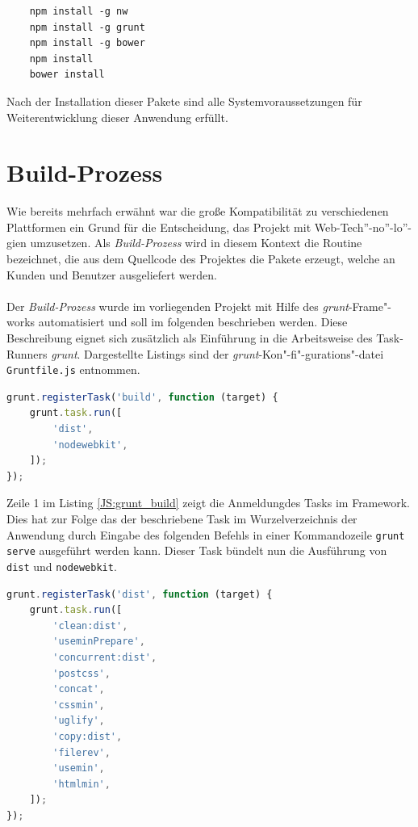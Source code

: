 \begin{lstlisting}
	npm install -g nw
	npm install -g grunt
	npm install -g bower
	npm install
	bower install
\end{lstlisting}

Nach der Installation dieser Pakete sind alle Systemvoraussetzungen für Weiterentwicklung dieser Anwendung erfüllt. 

\section{Build-Prozess}
Wie bereits mehrfach erwähnt war die große Kompatibilität zu verschiedenen Plattformen ein Grund für die Entscheidung, das Projekt mit Web-Tech”-no”-lo”-gien umzusetzen. Als \textit{Build-Prozess} wird in diesem Kontext die Routine bezeichnet, die aus dem Quellcode des Projektes die Pakete erzeugt, welche an Kunden und Benutzer ausgeliefert werden.

\paragraph{}Der \textit{Build-Prozess} wurde im vorliegenden Projekt mit Hilfe des \textit{grunt}-Frame"-works automatisiert und soll im folgenden beschrieben werden. Diese Beschreibung eignet sich zusätzlich als Einführung in die Arbeitsweise des \glqq Task-Runners \grqq \textit{grunt}. Dargestellte Listings sind der \textit{grunt}-Kon"-fi"-gurations"-datei \\\texttt{Gruntfile.js} entnommen.

\begin{lstlisting}[language=JavaScript,label=JS:grunt_build,caption=grunt build-Task]
grunt.registerTask('build', function (target) {
	grunt.task.run([
		'dist',
		'nodewebkit',
	]);
});
\end{lstlisting}

Zeile 1 im Listing \ref{JS:grunt_build} zeigt die \glqq Anmeldung\grqq des Tasks im Framework. Dies hat zur Folge das der beschriebene Task im Wurzelverzeichnis der Anwendung durch Eingabe des folgenden Befehls in einer Kommandozeile \texttt{grunt serve} ausgeführt werden kann. Dieser Task bündelt nun die Ausführung von \texttt{dist} und \texttt{nodewebkit}.

\begin{lstlisting}[language=JavaScript,label=JS:grunt_dist,caption=grunt dist-Task]
grunt.registerTask('dist', function (target) {
	grunt.task.run([
		'clean:dist',
		'useminPrepare',
		'concurrent:dist',
		'postcss',
		'concat',
		'cssmin',
		'uglify',
		'copy:dist',
		'filerev',
		'usemin',
		'htmlmin',
	]);
});
\end{lstlisting}

